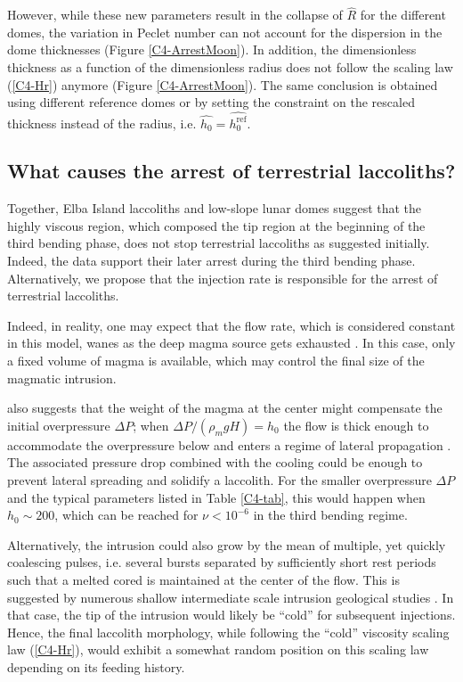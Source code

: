 However, while these new parameters result in the collapse of $\hat{R}$
for  the different  domes,  the  variation in  Peclet  number can  not
account   for  the   dispersion  in   the  dome   thicknesses  (Figure
\ref{C4-ArrestMoon}).  In  addition, the dimensionless thickness  as a
function of the  dimensionless radius does not follow  the scaling law
(\ref{C4-Hr})   anymore   (Figure  \ref{C4-ArrestMoon}).    The   same
conclusion is obtained  using different reference domes  or by setting
the constraint on  the rescaled thickness instead of  the radius, i.e.
$\hat{h_0}=\hat{h_0^{\text{ref}}}$.

\subsection{What causes the arrest of terrestrial laccoliths?}
\label{C4-sec:what-causes-arrest}

Together,  Elba Island  laccoliths and  low-slope lunar  domes suggest
that the highly  viscous region, which composed the tip  region at the
beginning  of  the third  bending  phase,  does not  stop  terrestrial
laccoliths  as suggested  initially.  Indeed,  the data  support their
later arrest during the third bending phase. Alternatively, we propose
that the injection  rate is responsible for the  arrest of terrestrial
laccoliths.

Indeed,  in reality,  one  may expect  that the  flow  rate, which  is
considered constant in this model, wanes as the deep magma source gets
exhausted \citep{Taisne:2009va,Rivalta:2010em}.  In  this case, only a
fixed volume of  magma is available, which may control  the final size
of the magmatic intrusion.

\citet{Michaut:2011kg} also suggests  that the weight of  the magma at
the center might compensate the  initial overpressure $\Delta P$; when
$\Delta P/(\rho_m  g H)=h_0$ the  flow is thick enough  to accommodate
the  overpressure below  and enters  a regime  of lateral  propagation
\citep{Michaut:2011kg}. The associated pressure drop combined with the
cooling could be enough to  prevent lateral spreading and solidify a
laccolith.  For  the smaller overpressure  $\Delta P$ and  the typical
parameters  listed  in  Table  \ref{C4-tab}, this  would  happen  when
$h_0\sim 200$,  which can  be reached for  $\nu<10^{-6}$ in  the third
bending regime.

Alternatively, the intrusion could also grow by the mean of multiple,
yet  quickly  coalescing  pulses,  i.e. several  bursts  separated  by
sufficiently short rest periods such that a melted cored is maintained
at the  center of  the flow.   This is  suggested by  numerous shallow
intermediate       scale       intrusion      geological       studies
\citep{Habert:2004wg,Horsman:2005ct,Morgan:2008hj,Leuthold:2012gja,Roni:2014gt}.
In that  case, the tip of  the intrusion would likely  be ``cold'' for
subsequent injections.   Hence, the final laccolith  morphology, while
following  the ``cold''  viscosity  scaling  law (\ref{C4-Hr}),  would
exhibit a  somewhat random position  on this scaling law  depending on
its feeding history.


